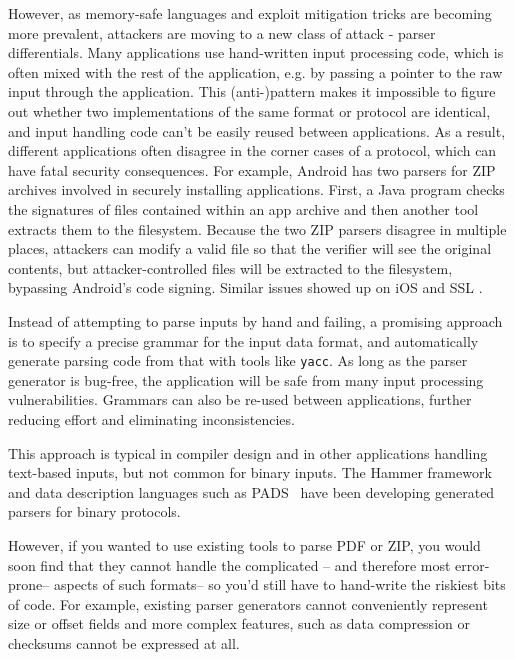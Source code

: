 However, as memory-safe languages and exploit mitigation  tricks are becoming more prevalent,
attackers are moving to a new class of attack - parser differentials. Many applications use
hand-written input processing code, which is often mixed with the rest of the application, e.g. by
passing a pointer to the raw input through the application. This (anti-)pattern makes it impossible
to figure out whether two implementations of the same format or protocol are identical, and input
handling code can't be easily reused between applications. As a result, different applications often
disagree in the corner cases of a protocol, which can have fatal security consequences. For example,
Android has two parsers for ZIP archives involved in securely installing applications. First, a Java
program checks the signatures of files contained within an app archive and then another tool
extracts them to the filesystem. Because the two ZIP parsers disagree in multiple places, attackers
can modify a valid file so that the verifier will see the original contents, but attacker-controlled
files will be extracted to the filesystem, bypassing Android's code signing. Similar issues showed
up on iOS \cite{geohot-evasion} and SSL \cite{DBLP:conf/fc/KaminskyPS10}. 

Instead of attempting to parse inputs by hand and failing, 
a promising approach is to specify
a precise grammar for the input data format, and automatically generate parsing code from that with tools like {\tt yacc}. As long
as the parser generator is bug-free, the application will be safe from many
input processing vulnerabilities. Grammars can also be re-used between
applications, further reducing effort and eliminating inconsistencies.

This approach is typical in compiler design and in other applications handling text-based inputs, but not
common for binary inputs. The Hammer framework~\cite{hammer-parser} and data description languages such as
PADS~\cite{Fisher:2005:PDL:1064978.1065046} have been developing generated parsers for binary protocols.

However, if you wanted to use existing tools to parse PDF
or ZIP, you would soon find that they cannot handle the complicated -- and therefore most
error-prone-- aspects of such formats-- so you'd still have to
hand-write the riskiest bits of code. For example, existing parser generators cannot conveniently represent size or offset fields and more complex features, such as data compression or checksums cannot be expressed at all.

